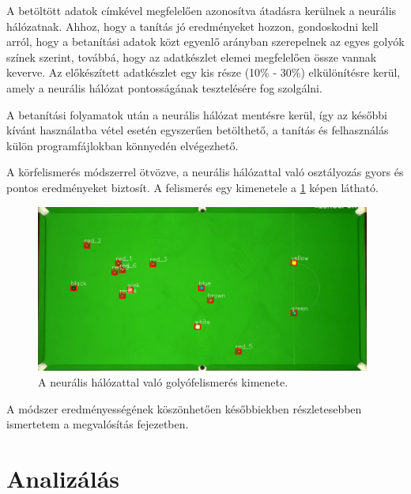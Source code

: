 \par A betöltött adatok címkével megfelelően azonosítva átadásra kerülnek a neurális hálózatnak. Ahhoz, hogy a tanítás jó eredményeket hozzon, gondoskodni kell arról, hogy a betanítási adatok közt egyenlő arányban szerepelnek az egyes golyók színek szerint, továbbá, hogy az adatkészlet elemei megfelelően össze vannak keverve. Az előkészített adatkészlet egy kis része (10\% - 30\%) elkülönítésre kerül, amely a neurális hálózat pontosságának tesztelésére fog szolgálni.
\par A betanítási folyamatok után a neurális hálózat mentésre kerül, így az későbbi kívánt használatba vétel esetén egyszerűen betölthető, a tanítás és felhasználás külön programfájlokban könnyedén elvégezhető.
\par A körfelismerés módszerrel ötvözve, a neurális hálózattal való osztályozás gyors és pontos eredményeket biztosít. A felismerés egy kimenetele a \ref{fig:felismert_asztal} képen látható.

\begin{figure}[!ht]
    \centering
    \includegraphics[width=110mm, keepaspectratio]{figures/recognised_table.png}
    \caption{A neurális hálózattal való golyófelismerés kimenete.}
    \label{fig:felismert_asztal}
\end{figure}

\par A módszer eredményességének köszönhetően későbbiekben részletesebben ismertetem a megvalósítás fejezetben.

\section{Analizálás}